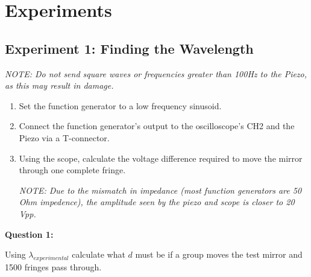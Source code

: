 \onecolumn

\section{Experiments}
	\subsection{Experiment 1: Finding the Wavelength}

\emph{NOTE: Do not send square waves or frequencies greater than 100Hz
to the Piezo, as this may result in damage.}

\begin{enumerate}
 	\item Set the function generator to a low frequency sinusoid.
	\item Connect the function generator's output to the oscilloscope's CH2
        and the Piezo via a T-connector.
	\item Using the scope, calculate the voltage difference required
		  to move the mirror through one complete fringe.

	\emph{NOTE: Due to the mismatch in impedance (most function generators
		are 50 Ohm impedence), the amplitude seen by the piezo and scope is closer to 20 Vpp.}

\end{enumerate}

\textbf{Question 1:}
	
	\indent Using $\lambda_{experimental}$ calculate what $d$ must be
	if a group moves the test mirror and 1500 fringes pass through.


